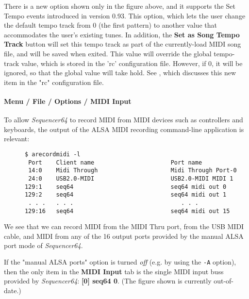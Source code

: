    There is a new option shown only in the figure above, and it supports the
   Set Tempo events introduced in version 0.93.  This option, which lets the
   user change the default tempo track from 0 (the first pattern) to another
   value that accommodates the user's existing tunes.
   In addition, the \textbf{Set as Song Tempo Track} button will set this tempo
   track as part of the currently-load MIDI song file, and will be saved when
   exited.  This value will override the global tempo-track value, which is
   stored in the 'rc' configuration file.  However, if 0, it will be ignored,
   so that the global value will take hold.
   See , which discusses this
   new item in the "rc" configuration file.

\paragraph{Menu / File / Options / MIDI Input}
\label{paragraph:seq64_menu_file_options_midi_input}

   To allow \textsl{Sequencer64} to record MIDI from MIDI devices such as
   controllers and keyboards, the output of the ALSA MIDI recording
   command-line application is relevant:

   \begin{verbatim}
      $ arecordmidi -l
       Port    Client name                      Port name
       14:0    Midi Through                     Midi Through Port-0
       24:0    USB2.0-MIDI                      USB2.0-MIDI MIDI 1
      129:1    seq64                            seq64 midi out 0
      129:2    seq64                            seq64 midi out 1
       . . .   . . .                               . . .
      129:16   seq64                            seq64 midi out 15
   \end{verbatim}


   We see that we can record MIDI from the MIDI Thru port, from the USB MIDI
   cable, and MIDI from any of the 16 output ports provided by the manual ALSA
   port mode of \textsl{Sequencer64}.

   If the "manual ALSA ports" option is turned \textsl{off} (e.g. by using the
   \texttt{-A} option),
   then the only item in the \textbf{MIDI Input} tab is the single MIDI input
   buss provided by \textsl{Sequencer64}:  \textbf{[0] seq64 0}.
   (The figure shown is currently out-of-date.)

